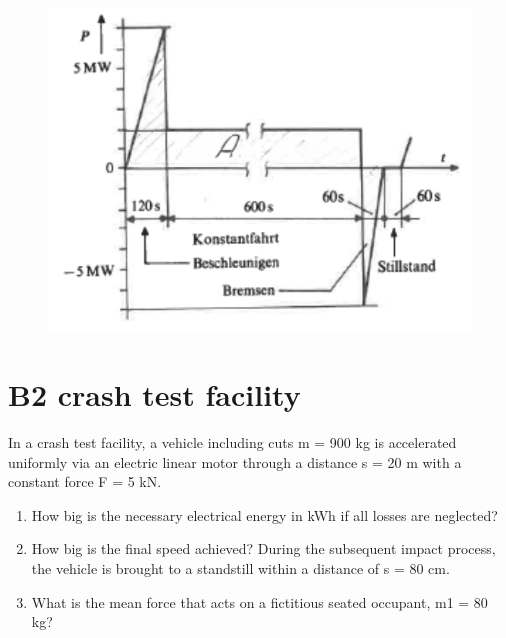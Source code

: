 \documentclass[10pt,ngerman]{scrartcl}
\begin{document}
\begin{figure}[H]
	\centering
	\includegraphics[scale=0.5]{group_work_1.png}
\end{figure}

\section{B2 crash test facility}
In a crash test facility, a vehicle including cuts m = 900 kg is accelerated uniformly via an electric linear motor through a distance s = 20 m with a constant force F = 5 kN.
\begin{enumerate}
	\item How big is the necessary electrical energy in kWh if all losses are neglected?
	\item How big is the final speed achieved? During the subsequent impact process, the vehicle is brought to a standstill within a distance of s = 80 cm.
	\item What is the mean force that acts on a fictitious seated occupant, m1 = 80 kg?
\end{enumerate}
\end{document}
